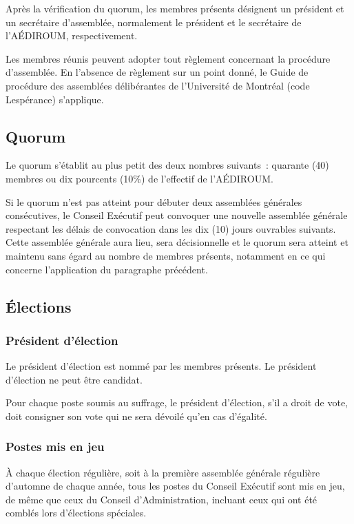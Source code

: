 \documentclass{aediroum}
\begin{document}
Après la vérification du quorum, les membres présents désignent un président et un secrétaire d'assemblée, normalement le président et le secrétaire de l'AÉDIROUM, respectivement.

Les membres réunis peuvent adopter tout règlement concernant la procédure d'assemblée. En l'absence de règlement sur un point donné, le Guide de procédure des assemblées délibérantes de l'Université de Montréal (code Lespérance) s'applique.

\subsection{Quorum}\label{sec:quorum}

Le quorum s'établit au plus petit des deux nombres suivants~: quarante (40) membres ou dix pourcents (10\%) de l'effectif de l'AÉDIROUM.

Si le quorum n'est pas atteint pour débuter deux assemblées générales consécutives, le Conseil Exécutif peut convoquer une nouvelle assemblée générale respectant les délais de convocation dans les dix (10) jours ouvrables suivants. Cette assemblée générale aura lieu, sera décisionnelle et le quorum sera atteint et maintenu sans égard au nombre de membres présents, notamment en ce qui concerne l'application du paragraphe précédent.

\subsection{Élections}\label{sec:elections}
\subsubsection{Président d'élection}\label{sec:president-delection}

Le président d'élection est nommé par les membres présents. Le président d'élection ne peut être candidat.

Pour chaque poste soumis au suffrage, le président d'élection, s'il a droit de vote, doit consigner son vote qui ne sera dévoilé qu'en cas d'égalité.

\subsubsection{Postes mis en jeu}\label{sec:postes-mis-en-jeu}
À chaque élection régulière, soit à la première assemblée générale régulière d'automne de chaque année, tous les postes du Conseil Exécutif sont mis en jeu, de même que ceux du Conseil d'Administration, incluant ceux qui ont été comblés lors d'élections spéciales.
\end{document}
